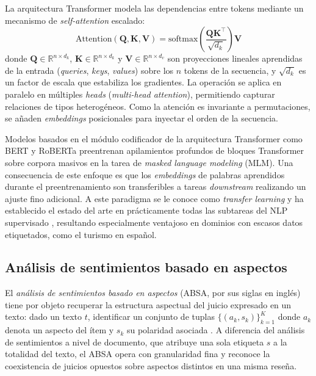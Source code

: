 La arquitectura Transformer modela las dependencias entre tokens mediante un mecanismo de \textit{self-attention} escalado:
\begin{equation} \label{eq:attention}
	\mathrm{Attention}(\mathbf{Q}, \mathbf{K}, \mathbf{V}) = \mathrm{softmax}\!\left(\frac{\mathbf{Q}\mathbf{K}^\top}{\sqrt{d_k}}\right)\mathbf{V}
\end{equation}
donde $\mathbf{Q} \in \mathbb{R}^{n \times d_k}$, $\mathbf{K} \in \mathbb{R}^{n \times d_k}$ y $\mathbf{V} \in \mathbb{R}^{n \times d_v}$ son proyecciones lineales aprendidas de la entrada (\textit{queries}, \textit{keys}, \textit{values}) sobre los $n$ tokens de la secuencia, y $\sqrt{d_k}$ es un factor de escala que estabiliza los gradientes. La operación se aplica en paralelo en múltiples \textit{heads} (\textit{multi-head attention}), permitiendo capturar relaciones de tipos heterogéneos. Como la atención es invariante a permutaciones, se añaden \textit{embeddings} posicionales para inyectar el orden de la secuencia.

Modelos basados en el módulo codificador de la arquitectura Transformer como BERT \citep{devlin_bert_2019} y RoBERTa \citep{liu2019roberta} preentrenan apilamientos profundos de bloques Transformer sobre corpora masivos en la tarea de \textit{masked language modeling} (MLM). Una consecuencia de este enfoque es que los \textit{embeddings} de palabras aprendidos durante el preentrenamiento son transferibles a tareas \textit{downstream} realizando un ajuste fino adicional. A este paradigma se le conoce como \textit{transfer learning} y ha establecido el estado del arte en prácticamente todas las subtareas del NLP supervisado \citep{zhang_survey_2023, do_deep_2019}, resultando especialmente ventajoso en dominios con escasos datos etiquetados, como el turismo en español.

\subsection{Análisis de sentimientos basado en aspectos} \label{subsec:absa_def}

El \textit{análisis de sentimientos basado en aspectos} (ABSA, por sus siglas en inglés) tiene por objeto recuperar la estructura aspectual del juicio expresado en un texto: dado un texto $t$, identificar un conjunto de tuplas $\{(a_k, s_k)\}_{k=1}^{K}$ donde $a_k$ denota un aspecto del ítem y $s_k$ su polaridad asociada \citep{liu_sentiment_2012, zhang_survey_2023}. A diferencia del análisis de sentimientos a nivel de documento, que atribuye una sola etiqueta $s$ a la totalidad del texto, el ABSA opera con granularidad fina y reconoce la coexistencia de juicios opuestos sobre aspectos distintos en una misma reseña.

